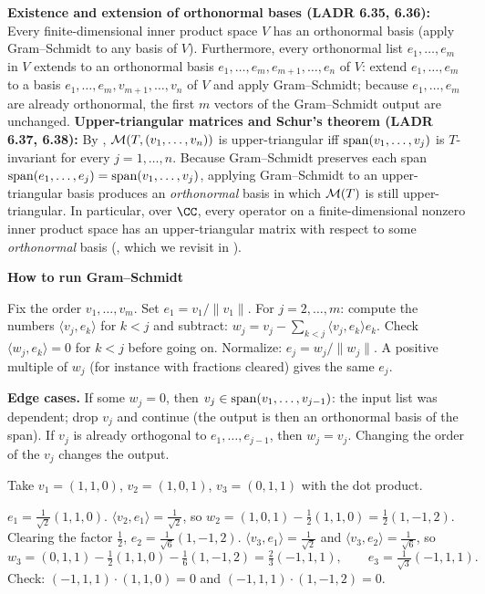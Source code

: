 \documentclass[10pt]{scrartcl}
\newcommand{\ip}[2]{\langle #1,#2\rangle}
\newenvironment{methodbox}[1]{\begin{mdframed}[style=mdbluebox,linecolor=NavyBlue,backgroundcolor=NavyBlue!3]\textbf{\color{NavyBlue}#1}\par\vspace{2pt}}{\end{mdframed}}
\begin{document}
\begin{itemize}
  \ii \textbf{Existence and extension of orthonormal bases (LADR 6.35, 6.36):} Every finite-dimensional inner product space $V$ has an orthonormal basis (apply Gram--Schmidt to any basis of $V$). Furthermore, every orthonormal list $e_1,\dots,e_m$ in $V$ extends to an orthonormal basis $e_1,\dots,e_m,e_{m+1},\dots,e_n$ of $V$: extend $e_1,\dots,e_m$ to a basis $e_1,\dots,e_m,v_{m+1},\dots,v_n$ of $V$ and apply Gram--Schmidt; because $e_1,\dots,e_m$ are already orthonormal, the first $m$ vectors of the Gram--Schmidt output are unchanged.
  \ii \textbf{Upper-triangular matrices and Schur's theorem (LADR 6.37, 6.38):} By , $\mathcal M(T,(v_1,\dots,v_n))$ is upper-triangular iff $\operatorname{span}(v_1,\dots,v_j)$ is $T$-invariant for every $j=1,\dots,n$. Because Gram--Schmidt preserves each span $\operatorname{span}(e_1,\dots,e_j)=\operatorname{span}(v_1,\dots,v_j)$, applying Gram--Schmidt to an upper-triangular basis produces an \emph{orthonormal} basis in which $\mathcal M(T)$ is still upper-triangular. In particular, over $\CC$, every operator on a finite-dimensional nonzero inner product space has an upper-triangular matrix with respect to some \emph{orthonormal} basis (, which we revisit in ).
\end{itemize}

\begin{methodbox}{How to run Gram--Schmidt}
\begin{enumerate}[label=\arabic*.,leftmargin=1.5em,itemsep=2pt,topsep=2pt]
  \ii Fix the order $v_1,\dots,v_m$. Set $e_1=v_1/\|v_1\|$.
  \ii For $j=2,\dots,m$: compute the numbers $\ip{v_j}{e_k}$ for $k<j$ and subtract: $w_j=v_j-\sum_{k<j}\ip{v_j}{e_k}e_k$.
  \ii Check $\ip{w_j}{e_k}=0$ for $k<j$ before going on.
  \ii Normalize: $e_j=w_j/\|w_j\|$. A positive multiple of $w_j$ (for instance with fractions cleared) gives the same $e_j$.
\end{enumerate}
\textbf{Edge cases.} If some $w_j=0$, then $v_j\in\operatorname{span}(v_1,\dots,v_{j-1})$: the input list was dependent; drop $v_j$ and continue (the output is then an orthonormal basis of the span). If $v_j$ is already orthogonal to $e_1,\dots,e_{j-1}$, then $w_j=v_j$. Changing the order of the $v_j$ changes the output.
\end{methodbox}

\begin{example*}
  Take $v_1=(1,1,0)$, $v_2=(1,0,1)$, $v_3=(0,1,1)$ with the dot product.
  \begin{steps}
    \ii $e_1=\frac1{\sqrt2}(1,1,0)$.
    \ii $\ip{v_2}{e_1}=\frac1{\sqrt2}$, so $w_2=(1,0,1)-\frac12(1,1,0)=\frac12(1,-1,2)$. Clearing the factor $\frac12$, $e_2=\frac1{\sqrt6}(1,-1,2)$.
    \ii $\ip{v_3}{e_1}=\frac1{\sqrt2}$ and $\ip{v_3}{e_2}=\frac{1}{\sqrt6}$, so
    \[ w_3=(0,1,1)-\tfrac12(1,1,0)-\tfrac16(1,-1,2)=\tfrac23(-1,1,1),\qquad e_3=\tfrac1{\sqrt3}(-1,1,1). \]
    \ii Check: $(-1,1,1)\cdot(1,1,0)=0$ and $(-1,1,1)\cdot(1,-1,2)=0$.
  \end{steps}
\end{example*}
\end{document}
